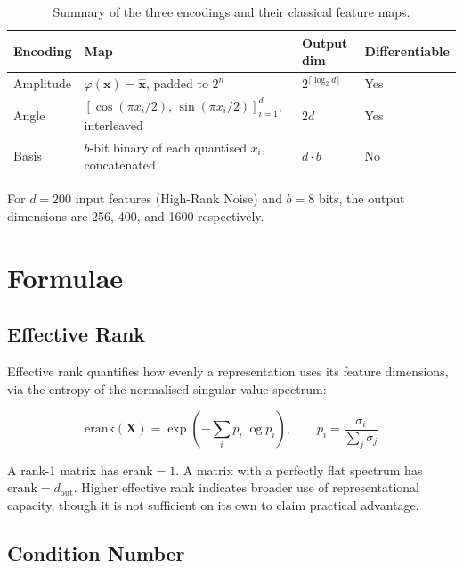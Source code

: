 \documentclass[11pt, a4paper]{article}
\begin{document}
\begin{table}[h]
\centering
\begin{tabular}{llll}
\toprule
\textbf{Encoding} & \textbf{Map} & \textbf{Output dim} & \textbf{Differentiable} \\
\midrule
Amplitude & $\varphi(\mathbf{x}) = \hat{\mathbf{x}}$, padded to $2^n$ & $2^{\lceil \log_2 d \rceil}$ & Yes \\
Angle     & $[\cos(\pi x_i/2),\, \sin(\pi x_i/2)]_{i=1}^{d}$, interleaved & $2d$ & Yes \\
Basis     & $b$-bit binary of each quantised $x_i$, concatenated & $d \cdot b$ & No \\
\bottomrule
\end{tabular}
\caption{Summary of the three encodings and their classical feature maps.}
\end{table}

For $d = 200$ input features (High-Rank Noise) and $b = 8$ bits, the output
dimensions are 256, 400, and 1600 respectively.

\section{Formulae}

\subsection{Effective Rank}

Effective rank quantifies how evenly a representation uses its feature
dimensions, via the entropy of the normalised singular value spectrum:

\begin{equation}
    \mathrm{erank}(\mathbf{X}) = \exp\!\left( -\sum_{i} p_i \log p_i \right),
    \qquad p_i = \frac{\sigma_i}{\sum_j \sigma_j}
    \label{eq:erank}
\end{equation}

A rank-1 matrix has $\mathrm{erank} = 1$.  A matrix with a perfectly flat
spectrum has $\mathrm{erank} = d_{\mathrm{out}}$.  Higher effective rank
indicates broader use of representational capacity, though it is not
sufficient on its own to claim practical advantage.

\subsection{Condition Number}
\end{document}
